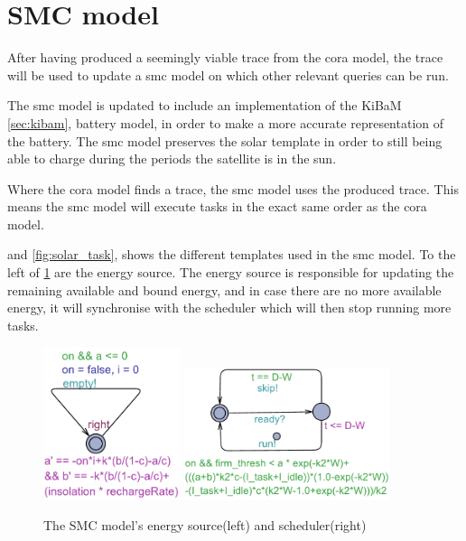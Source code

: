 \section{SMC model}
After having produced a seemingly viable trace from the \gls{cora} model, the trace will be used to update a \gls{smc} model on which other relevant queries can be run.

The \gls{smc} model is updated to include an implementation of the KiBaM \cref{sec:kibam}, battery model, in order to make a more accurate representation of the battery. The \gls{smc} model preserves the solar template in order to still being able to charge during the periods the satellite is in the sun.

Where the \gls{cora} model finds a trace, the \gls{smc} model uses the produced trace. This means the \gls{smc} model will execute tasks in the exact same order as the \gls{cora} model. 

 and \cref{fig:solar_task}, shows the different templates used in the \gls{smc} model. To the left of \cref{fig:cost_schedule} are the energy source. The energy source is responsible for updating the remaining available and bound energy, and in case there are no more available energy, it will synchronise with the scheduler which will then stop running more tasks.


\begin{figure}[H]%
	\centering
	\subfloat
	{{\includegraphics[width=4cm]{graphics/smc_costhandler.pdf} }}%
	\qquad
	\subfloat
	{{\includegraphics[width=6cm]{graphics/smc_scheduler.pdf} }}%
	\caption{The SMC model's energy source(left) and scheduler(right)}%
	\label{fig:cost_schedule}%
\end{figure}

